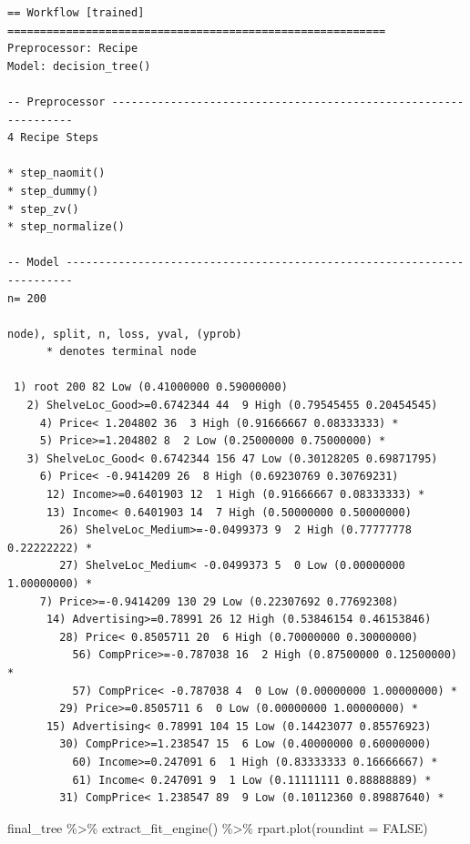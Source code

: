 \documentclass[
]{article}
\newenvironment{Shaded}{\begin{snugshade}}{\end{snugshade}}
\newcommand{\AttributeTok}[1]{\textcolor[rgb]{0.40,0.45,0.13}{#1}}
\newcommand{\ConstantTok}[1]{\textcolor[rgb]{0.56,0.35,0.01}{#1}}
\newcommand{\FunctionTok}[1]{\textcolor[rgb]{0.28,0.35,0.67}{#1}}
\newcommand{\NormalTok}[1]{\textcolor[rgb]{0.00,0.23,0.31}{#1}}
\newcommand{\SpecialCharTok}[1]{\textcolor[rgb]{0.37,0.37,0.37}{#1}}
\begin{document}
\begin{verbatim}
== Workflow [trained] ==========================================================
Preprocessor: Recipe
Model: decision_tree()

-- Preprocessor ----------------------------------------------------------------
4 Recipe Steps

* step_naomit()
* step_dummy()
* step_zv()
* step_normalize()

-- Model -----------------------------------------------------------------------
n= 200 

node), split, n, loss, yval, (yprob)
      * denotes terminal node

 1) root 200 82 Low (0.41000000 0.59000000)  
   2) ShelveLoc_Good>=0.6742344 44  9 High (0.79545455 0.20454545)  
     4) Price< 1.204802 36  3 High (0.91666667 0.08333333) *
     5) Price>=1.204802 8  2 Low (0.25000000 0.75000000) *
   3) ShelveLoc_Good< 0.6742344 156 47 Low (0.30128205 0.69871795)  
     6) Price< -0.9414209 26  8 High (0.69230769 0.30769231)  
      12) Income>=0.6401903 12  1 High (0.91666667 0.08333333) *
      13) Income< 0.6401903 14  7 High (0.50000000 0.50000000)  
        26) ShelveLoc_Medium>=-0.0499373 9  2 High (0.77777778 0.22222222) *
        27) ShelveLoc_Medium< -0.0499373 5  0 Low (0.00000000 1.00000000) *
     7) Price>=-0.9414209 130 29 Low (0.22307692 0.77692308)  
      14) Advertising>=0.78991 26 12 High (0.53846154 0.46153846)  
        28) Price< 0.8505711 20  6 High (0.70000000 0.30000000)  
          56) CompPrice>=-0.787038 16  2 High (0.87500000 0.12500000) *
          57) CompPrice< -0.787038 4  0 Low (0.00000000 1.00000000) *
        29) Price>=0.8505711 6  0 Low (0.00000000 1.00000000) *
      15) Advertising< 0.78991 104 15 Low (0.14423077 0.85576923)  
        30) CompPrice>=1.238547 15  6 Low (0.40000000 0.60000000)  
          60) Income>=0.247091 6  1 High (0.83333333 0.16666667) *
          61) Income< 0.247091 9  1 Low (0.11111111 0.88888889) *
        31) CompPrice< 1.238547 89  9 Low (0.10112360 0.89887640) *
\end{verbatim}

\begin{Shaded}
\begin{Highlighting}[]
\NormalTok{final\_tree }\SpecialCharTok{\%\textgreater{}\%}
  \FunctionTok{extract\_fit\_engine}\NormalTok{() }\SpecialCharTok{\%\textgreater{}\%}
  \FunctionTok{rpart.plot}\NormalTok{(}\AttributeTok{roundint =} \ConstantTok{FALSE}\NormalTok{)}
\end{Highlighting}
\end{Shaded}
\end{document}
